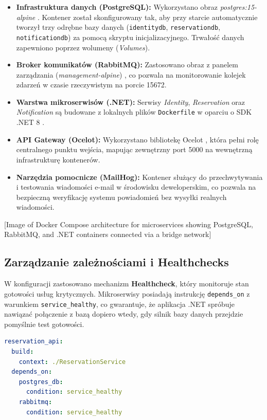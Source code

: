 \begin{itemize}
    \item \textbf{Infrastruktura danych (PostgreSQL):} Wykorzystano obraz \textit{postgres:15-alpine} \cite{postgresql_docs}. Kontener został skonfigurowany tak, aby przy starcie automatycznie tworzył trzy odrębne bazy danych (\texttt{identitydb}, \texttt{reservationdb}, \texttt{notificationdb}) za pomocą skryptu inicjalizacyjnego. Trwałość danych zapewniono poprzez wolumeny (\textit{Volumes}).
    \item \textbf{Broker komunikatów (RabbitMQ):} Zastosowano obraz z panelem zarządzania (\textit{management-alpine}) \cite{rabbitmq_docs}, co pozwala na monitorowanie kolejek zdarzeń w czasie rzeczywistym na porcie 15672.
    \item \textbf{Warstwa mikroserwisów (.NET):} Serwisy \textit{Identity}, \textit{Reservation} oraz \textit{Notification} są budowane z lokalnych plików \texttt{Dockerfile} w oparciu o SDK .NET 8 \cite{dotnet_microsoft}. 
    \item \textbf{API Gateway (Ocelot):} Wykorzystano bibliotekę Ocelot \cite{ocelot_docs}, która pełni rolę centralnego punktu wejścia, mapując zewnętrzny port 5000 na wewnętrzną infrastrukturę kontenerów.
    \item \textbf{Narzędzia pomocnicze (MailHog):} Kontener służący do przechwytywania i testowania wiadomości e-mail w środowisku deweloperskim, co pozwala na bezpieczną weryfikację systemu powiadomień bez wysyłki realnych wiadomości.
\end{itemize}

[Image of Docker Compose architecture for microservices showing PostgreSQL, RabbitMQ, and .NET containers connected via a bridge network]

\subsection{Zarządzanie zależnościami i Healthchecks}
W konfiguracji zastosowano mechanizm \textbf{Healthcheck}, który monitoruje stan gotowości usług krytycznych. Mikroserwisy posiadają instrukcję \texttt{depends\_on} z warunkiem \texttt{service\_healthy}, co gwarantuje, że aplikacja .NET spróbuje nawiązać połączenie z bazą dopiero wtedy, gdy silnik bazy danych przejdzie pomyślnie test gotowości.

\begin{lstlisting}[language=yaml, caption={Fragment konfiguracji Docker Compose obsługujący zależności}]
reservation_api:
  build:
    context: ./ReservationService
  depends_on:
    postgres_db:
      condition: service_healthy
    rabbitmq:
      condition: service_healthy
\end{lstlisting}

